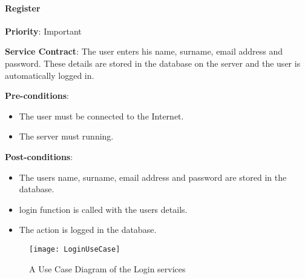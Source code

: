     	\paragraph{Register}
			\begin{description}
			    \item{\textbf{Priority}:} Important
			    \item{\textbf{Service Contract}:} The user enters his name, surname, email address and password. These details are stored in the database on the server and the user is automatically logged in.
			    \item{\textbf{Pre-conditions}:}%
    			    \begin{itemize}
    			        \item The user must be connected to the Internet.
    			        \item The server must running.
    			    \end{itemize}
			    \item{\textbf{Post-conditions}:} %
    			    \begin{itemize}
    			    \item The users name, surname, email address and password are stored in the database. 
    			    \item login function is called with the users details.
    			    \item  The action is logged in the database.
    			    \end{itemize}
			\end{description}
	
	\begin{figure}[H]	
 			 \centering
			  \texttt{[image: LoginUseCase]}
		 	 \caption{A Use Case Diagram of the Login services}
		\end{figure}
